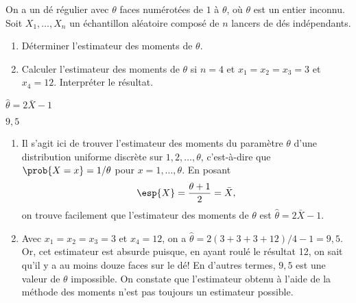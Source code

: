 \begin{exercice}
  On a un dé régulier avec $\theta$ faces numérotées de $1$ à
  $\theta$, où $\theta$ est un entier inconnu. Soit $X_1, \dots,
  X_n$ un échantillon aléatoire composé de $n$ lancers de dés indépendants.
  \begin{enumerate}
  \item Déterminer l'estimateur des moments de $\theta$.
  \item Calculer l'estimateur des moments de $\theta$ si $n = 4$ et
    $x_1 = x_2 = x_3 = 3$ et $x_4 = 12$. Interpréter le résultat.
  \end{enumerate}
  \begin{rep}
    \begin{inparaenum}
    \item $\hat{\theta} = 2 \bar{X} - 1$
    \item $9,5$
    \end{inparaenum}
  \end{rep}
  \begin{sol}
    \begin{enumerate}
    \item Il s'agit ici de trouver l'estimateur des moments du
      paramètre $\theta$ d'une distribution uniforme discrète sur $1,
      2, \dots, \theta$, c'est-à-dire que $\prob{X = x} = 1/\theta$
      pour $x = 1, \dots, \theta$. En posant
      \begin{align*}
        \esp{X} = \frac{\theta + 1}{2} = \bar{X},
      \end{align*}
      on trouve facilement que l'estimateur des moments de $\theta$
      est $\hat{\theta} = 2 \bar{X} - 1$.
    \item Avec $x_1 = x_2 = x_3 = 3$ et $x_4 = 12$, on a $\hat{\theta}
      = 2 (3 + 3 + 3 + 12)/4 - 1 = 9,5$. Or, cet estimateur est
      absurde puisque, en ayant roulé le résultat 12, on sait qu'il y a au
      moins douze faces sur le dé! En d'autres termes, $9,5$ est
      une valeur de $\theta$ impossible. On constate que l'estimateur
      obtenu à l'aide de la méthode des moments n'est pas toujours un
      estimateur possible.
    \end{enumerate}
  \end{sol}
\end{exercice}



